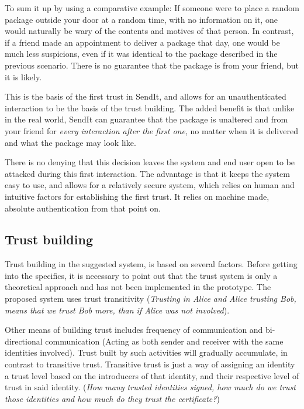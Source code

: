 		To sum it up by using a comparative example: If someone were to place a random package outside your door at a random time, with no information on it, one would naturally be wary of the contents and motives of that person. In contrast, if a friend made an appointment to deliver a package that day, one would be much less suspicions, even if it was identical to the package described in the previous scenario. There is no guarantee that the package is from your friend, but it is likely.

		This is the basis of the first trust in SendIt, and allows for an unauthenticated interaction to be the basis of the trust building.  The added benefit is that unlike in the real world, SendIt can guarantee that the package is unaltered and from your friend for \emph{every interaction after the first one}, no matter when it is delivered and what the package may look like.

		There is no denying that this decision leaves the system and end user open to be attacked during this first interaction. The advantage is that it keeps the system easy to use, and allows for a relatively secure system, which relies on human and intuitive factors for establishing the first trust. It relies on machine made, absolute authentication from that point on.

	\subsection{Trust building}
		Trust building in the suggested system, is based on several factors. Before getting into the specifics, it is necessary to point out that the trust system is only a theoretical approach and has not been implemented in the prototype. The proposed system uses trust transitivity \cite{lcns_semantic} (\emph{Trusting in Alice and Alice trusting Bob, means that we trust Bob more, than if Alice was not involved}).

		Other means of building trust includes frequency of communication and bi-directional communication (Acting as both sender and receiver with the same identities involved). Trust built by such activities will gradually accumulate, in contrast to transitive trust. Transitive trust is just a way of assigning an identity a trust level based on the introducers of that identity, and their respective level of trust in said identity. (\emph{How many trusted identities signed, how much do we trust those identities and how much do they trust the certificate?})

